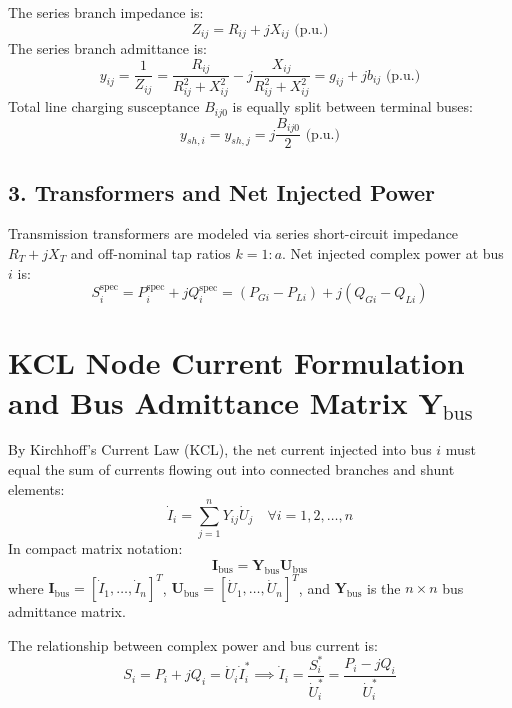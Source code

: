 \documentclass[12pt,a4paper,oneside]{report}
\begin{document}
The series branch impedance is:
\begin{equation}
Z_{ij} = R_{ij} + j X_{ij}\text{ (p.u.)}
\end{equation}
The series branch admittance is:
\begin{equation}
y_{ij} = \frac{1}{Z_{ij}} = \frac{R_{ij}}{R_{ij}^2 + X_{ij}^2} - j \frac{X_{ij}}{R_{ij}^2 + X_{ij}^2} = g_{ij} + j b_{ij}\text{ (p.u.)}
\end{equation}
Total line charging susceptance $B_{ij0}$ is equally split between terminal buses:
\begin{equation}
y_{sh,i} = y_{sh,j} = j \frac{B_{ij0}}{2}\text{ (p.u.)}
\end{equation}

\subsection{3. Transformers and Net Injected Power}
Transmission transformers are modeled via series short-circuit impedance $R_T + jX_T$ and off-nominal tap ratios $k = 1:a$. Net injected complex power at bus $i$ is:
\begin{equation}
S_i^{\text{spec}} = P_i^{\text{spec}} + j Q_i^{\text{spec}} = (P_{Gi} - P_{Li}) + j (Q_{Gi} - Q_{Li})
\end{equation}

\section{KCL Node Current Formulation and Bus Admittance Matrix $\mathbf{Y}_{\text{bus}}$}
By Kirchhoff's Current Law (KCL), the net current injected into bus $i$ must equal the sum of currents flowing out into connected branches and shunt elements:
\begin{equation}
\dot{I}_i = \sum_{j=1}^n Y_{ij} \dot{U}_j \quad \forall i = 1, 2, \dots, n
\end{equation}
In compact matrix notation:
\begin{equation}
\mathbf{I}_{\text{bus}} = \mathbf{Y}_{\text{bus}} \mathbf{U}_{\text{bus}}
\end{equation}
where $\mathbf{I}_{\text{bus}} = [\dot{I}_1, \dots, \dot{I}_n]^T$, $\mathbf{U}_{\text{bus}} = [\dot{U}_1, \dots, \dot{U}_n]^T$, and $\mathbf{Y}_{\text{bus}}$ is the $n \times n$ bus admittance matrix.

\noindent The relationship between complex power and bus current is:
\begin{equation}
S_i = P_i + jQ_i = \dot{U}_i \dot{I}_i^* \implies \dot{I}_i = \frac{S_i^*}{\dot{U}_i^*} = \frac{P_i - jQ_i}{\dot{U}_i^*}
\end{equation}
\end{document}
